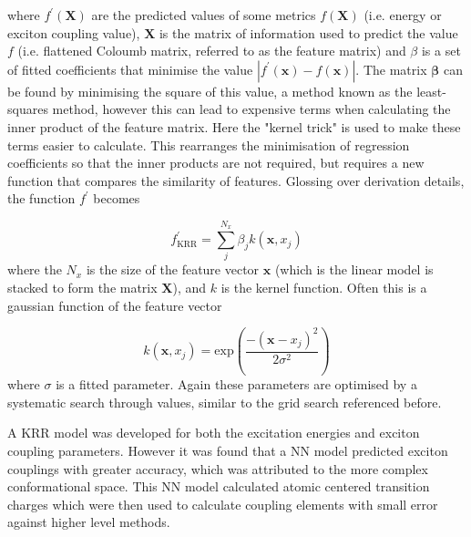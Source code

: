 where $f^\prime\left(\mathbf{X}\right)$ are the predicted values of some metrics $f\left(\mathbf{X}\right)$ 
(i.e. \Qy energy or exciton coupling value), $\mathbf{X}$ is the matrix of information
used to predict the value $f$ (i.e. flattened Coloumb matrix, referred to as the feature
matrix) and $\beta$ is a set of fitted coefficients that minimise the value $\left\lvert f^\prime \left( \mathbf{x}\right) - f \left(\mathbf{x}\right)\right\rvert$.
The matrix $\mathbf{\beta}$ can be found by minimising the square of this value, 
a method known as the least-squares method, however this can lead to expensive terms 
when calculating the inner product of the feature matrix. Here the "kernel trick" 
is used to make these terms easier to calculate. This rearranges the minimisation 
of regression coefficients so that the inner products are not required, but requires 
a new function that compares the similarity of features. Glossing over derivation
details, the function $f^\prime$ becomes

\begin{equation}
	f_{\text{KRR}}^\prime = \sum^{N_x}_j \beta_j k\left(\mathbf{x}, x_j\right)
\end{equation}
%
where the $N_x$ is the size of the feature vector $\mathbf{x}$ (which is the linear
model is stacked to form the matrix $\mathbf{X}$), and $k$ is the kernel function.
Often this is a gaussian function of the feature vector

\begin{equation}
	k\left(\mathbf{x}, x_j\right) = \text{exp}\left(\frac{-\left(\mathbf{x}-x_j\right)^2}{2\sigma^2}\right)
\end{equation}
%
where $\sigma$ is a fitted parameter. Again these parameters are optimised by a 
systematic search through values, similar to the grid search referenced before.

A KRR model was developed for both the excitation energies and exciton coupling 
parameters. However it was found that a NN model predicted exciton couplings with
greater accuracy, which was attributed to the more complex conformational space.
This NN model calculated atomic centered transition charges which were then used
to calculate coupling elements with small error against higher level methods.

